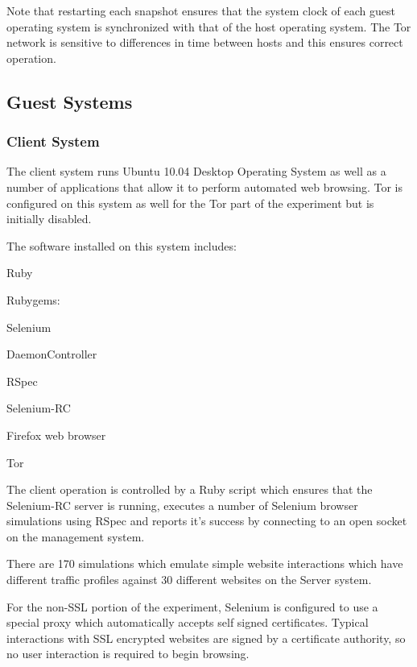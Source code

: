Note that restarting each snapshot ensures that the system clock of each guest
operating system is synchronized with that of the host operating system. The
Tor network is sensitive to differences in time between hosts and this ensures
correct operation.

\subsection{Guest Systems}

\subsubsection{Client System}

The client system runs Ubuntu 10.04 Desktop Operating System as well as a
number of applications that allow it to perform automated web browsing. Tor is
configured on this system as well for the Tor part of the experiment but is
initially disabled.

The software installed on this system includes:

\begin{itemize*}
  \item Ruby
  \item Rubygems:
    \begin{itemize*}
      \item Selenium
      \item DaemonController
      \item RSpec
    \end{itemize*}
  \item Selenium-RC
  \item Firefox web browser
  \item Tor
\end{itemize*}

The client operation is controlled by a Ruby script which ensures that the
Selenium-RC server is running, executes a number of Selenium browser
simulations using RSpec and reports it's success by connecting to an open
socket on the management system.

There are 170 simulations which emulate simple website interactions which have
different traffic profiles against 30 different websites on the Server system.

For the non-SSL portion of the experiment, Selenium is configured to use a
special proxy which automatically accepts self signed certificates. Typical
interactions with SSL encrypted websites are signed by a certificate authority,
so no user interaction is required to begin browsing.

